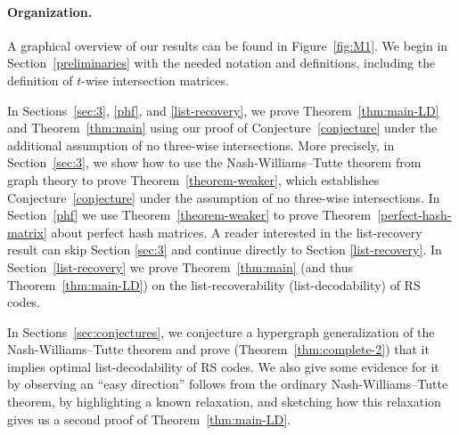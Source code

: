 \documentclass[11pt]{article}
\newcommand{\ryl}[1]{{\color{red} {\small [Ray: #1]}}}
\begin{document}
\paragraph{Organization.}
A graphical overview of our results can be found in Figure~\ref{fig:M1}.
We begin in Section~\ref{preliminaries} with the needed notation and definitions, including the definition of $t$-wise intersection matrices.

In Sections~\ref{sec:3}, \ref{phf}, and \ref{list-recovery}, we prove Theorem~\ref{thm:main-LD} and Theorem~\ref{thm:main} using our proof of Conjecture~\ref{conjecture} under the additional assumption of no three-wise intersections.  More precisely,
in Section~\ref{sec:3}, we show how to use the Nash-Williams--Tutte theorem from graph theory to prove Theorem~\ref{theorem-weaker}, which establishes Conjecture~\ref{conjecture} under the assumption of no three-wise intersections.
In Section~\ref{phf} we use Theorem~\ref{theorem-weaker} to prove Theorem~\ref{perfect-hash-matrix} about perfect hash matrices. A reader interested in the list-recovery result can skip Section \ref{sec:3} and continue directly to Section \ref{list-recovery}.
In Section~\ref{list-recovery} we prove Theorem~\ref{thm:main} (and thus Theorem~\ref{thm:main-LD}) on the list-recoverability (list-decodability) of RS codes.

In Sections~\ref{sec:conjectures}, we conjecture a hypergraph generalization of the Nash-Williams--Tutte theorem and prove (Theorem~\ref{thm:complete-2}) that it implies optimal list-decodability of RS codes.
We also give some evidence for it by observing an ``easy direction'' follows from the ordinary Nash-Williams--Tutte theorem, by highlighting a known relaxation, and sketching how this relaxation gives us a second proof of Theorem~\ref{thm:main-LD}.



%
\end{document}
